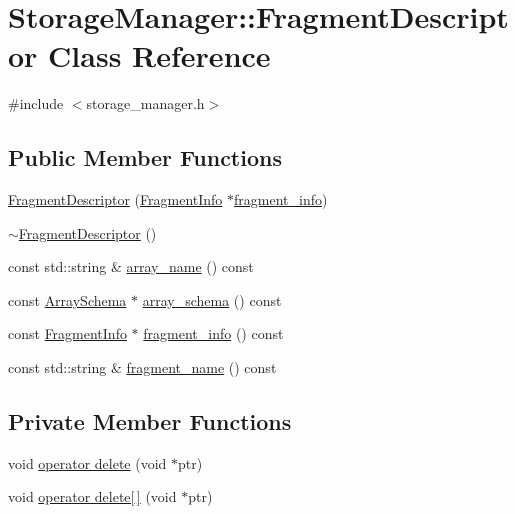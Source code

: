 \hypertarget{classStorageManager_1_1FragmentDescriptor}{}\section{Storage\+Manager\+:\+:Fragment\+Descriptor Class Reference}
\label{classStorageManager_1_1FragmentDescriptor}


{\ttfamily \#include $<$storage\+\_\+manager.\+h$>$}

\subsection*{Public Member Functions}
\begin{DoxyCompactItemize}
\item 
\hyperlink{classStorageManager_1_1FragmentDescriptor_ac2ea05fa7d89a5fb440cd4e2d242073e}{Fragment\+Descriptor} (\hyperlink{structStorageManager_1_1FragmentInfo}{Fragment\+Info} $\ast$\hyperlink{classStorageManager_1_1FragmentDescriptor_ac8f95b391bc405e272a65a9cbf1fd34c}{fragment\+\_\+info})
\item 
\hyperlink{classStorageManager_1_1FragmentDescriptor_a1be3ba8e53cbdf7fff8360e80a9e5aec}{$\sim$\+Fragment\+Descriptor} ()
\item 
const std\+::string \& \hyperlink{classStorageManager_1_1FragmentDescriptor_a10b586420f721f6527ae2b4820bd2492}{array\+\_\+name} () const 
\item 
const \hyperlink{classArraySchema}{Array\+Schema} $\ast$ \hyperlink{classStorageManager_1_1FragmentDescriptor_a391a2946ae3eb8ac5f702061cbb37d79}{array\+\_\+schema} () const 
\item 
const \hyperlink{structStorageManager_1_1FragmentInfo}{Fragment\+Info} $\ast$ \hyperlink{classStorageManager_1_1FragmentDescriptor_ac8f95b391bc405e272a65a9cbf1fd34c}{fragment\+\_\+info} () const 
\item 
const std\+::string \& \hyperlink{classStorageManager_1_1FragmentDescriptor_af932b5a3e8d3802c63dfb13fb41f2cdb}{fragment\+\_\+name} () const 
\end{DoxyCompactItemize}
\subsection*{Private Member Functions}
\begin{DoxyCompactItemize}
\item 
void \hyperlink{classStorageManager_1_1FragmentDescriptor_a9f50e1eb044c1e856ffe274a828d770f}{operator delete} (void $\ast$ptr)
\item 
void \hyperlink{classStorageManager_1_1FragmentDescriptor_a59a1511a413e6593157079e9067f9a8d}{operator delete\mbox{[}$\,$\mbox{]}} (void $\ast$ptr)
\end{DoxyCompactItemize}

